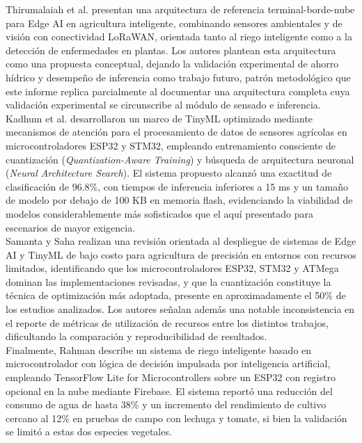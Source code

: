 \documentclass[12pt,a4paper]{article}
\begin{document}
Thirumalaiah et al. \cite{thirumalaiah2025} presentan una arquitectura de referencia terminal-borde-nube para Edge AI en agricultura inteligente, combinando sensores ambientales y de visión con conectividad LoRaWAN, orientada tanto al riego inteligente como a la detección de enfermedades en plantas. Los autores plantean esta arquitectura como una propuesta conceptual, dejando la validación experimental de ahorro hídrico y desempeño de inferencia como trabajo futuro, patrón metodológico que este informe replica parcialmente al documentar una arquitectura completa cuya validación experimental se circunscribe al módulo de sensado e inferencia.\\

Kadhum et al. \cite{kadhum2025} desarrollaron un marco de TinyML optimizado mediante mecanismos de atención para el procesamiento de datos de sensores agrícolas en microcontroladores ESP32 y STM32, empleando entrenamiento consciente de cuantización (\textit{Quantization-Aware Training}) y búsqueda de arquitectura neuronal (\textit{Neural Architecture Search}). El sistema propuesto alcanzó una exactitud de clasificación de 96.8\%, con tiempos de inferencia inferiores a 15 ms y un tamaño de modelo por debajo de 100 KB en memoria flash, evidenciando la viabilidad de modelos considerablemente más sofisticados que el aquí presentado para escenarios de mayor exigencia.\\

Samanta y Saha \cite{samanta2026} realizan una revisión orientada al despliegue de sistemas de Edge AI y TinyML de bajo costo para agricultura de precisión en entornos con recursos limitados, identificando que los microcontroladores ESP32, STM32 y ATMega dominan las implementaciones revisadas, y que la cuantización constituye la técnica de optimización más adoptada, presente en aproximadamente el 50\% de los estudios analizados. Los autores señalan además una notable inconsistencia en el reporte de métricas de utilización de recursos entre los distintos trabajos, dificultando la comparación y reproducibilidad de resultados.\\

Finalmente, Rahman \cite{rahman2025} describe un sistema de riego inteligente basado en microcontrolador con lógica de decisión impulsada por inteligencia artificial, empleando TensorFlow Lite for Microcontrollers sobre un ESP32 con registro opcional en la nube mediante Firebase. El sistema reportó una reducción del consumo de agua de hasta 38\% y un incremento del rendimiento de cultivo cercano al 12\% en pruebas de campo con lechuga y tomate, si bien la validación se limitó a estas dos especies vegetales.\\
\end{document}
